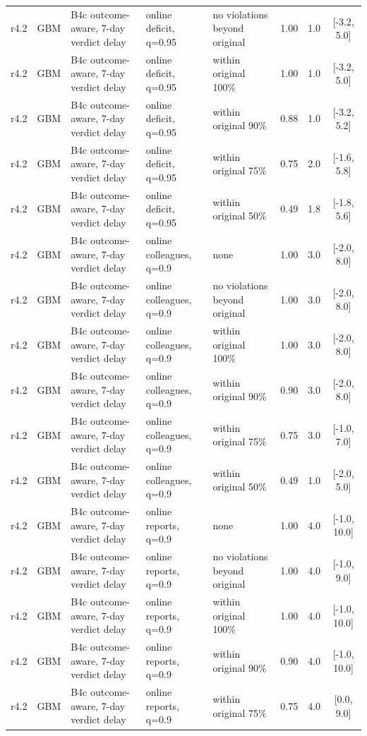 \documentclass[10pt,onecolumn,letterpaper]{article}
\begin{document}
\begin{longtable}{lllp{4.2cm}p{3.4cm}ccc}
r4.2 & GBM & B4c outcome-aware, 7-day verdict delay & online deficit, q=0.95 & no violations beyond original & 1.00 & 1.0 & [-3.2, 5.0] \\
r4.2 & GBM & B4c outcome-aware, 7-day verdict delay & online deficit, q=0.95 & within original 100\% & 1.00 & 1.0 & [-3.2, 5.0] \\
r4.2 & GBM & B4c outcome-aware, 7-day verdict delay & online deficit, q=0.95 & within original 90\% & 0.88 & 1.0 & [-3.2, 5.2] \\
r4.2 & GBM & B4c outcome-aware, 7-day verdict delay & online deficit, q=0.95 & within original 75\% & 0.75 & 2.0 & [-1.6, 5.8] \\
r4.2 & GBM & B4c outcome-aware, 7-day verdict delay & online deficit, q=0.95 & within original 50\% & 0.49 & 1.8 & [-1.8, 5.6] \\
r4.2 & GBM & B4c outcome-aware, 7-day verdict delay & online colleagues, q=0.9 & none & 1.00 & 3.0 & [-2.0, 8.0] \\
r4.2 & GBM & B4c outcome-aware, 7-day verdict delay & online colleagues, q=0.9 & no violations beyond original & 1.00 & 3.0 & [-2.0, 8.0] \\
r4.2 & GBM & B4c outcome-aware, 7-day verdict delay & online colleagues, q=0.9 & within original 100\% & 1.00 & 3.0 & [-2.0, 8.0] \\
r4.2 & GBM & B4c outcome-aware, 7-day verdict delay & online colleagues, q=0.9 & within original 90\% & 0.90 & 3.0 & [-2.0, 8.0] \\
r4.2 & GBM & B4c outcome-aware, 7-day verdict delay & online colleagues, q=0.9 & within original 75\% & 0.75 & 3.0 & [-1.0, 7.0] \\
r4.2 & GBM & B4c outcome-aware, 7-day verdict delay & online colleagues, q=0.9 & within original 50\% & 0.49 & 1.0 & [-2.0, 5.0] \\
r4.2 & GBM & B4c outcome-aware, 7-day verdict delay & online reports, q=0.9 & none & 1.00 & 4.0 & [-1.0, 10.0] \\
r4.2 & GBM & B4c outcome-aware, 7-day verdict delay & online reports, q=0.9 & no violations beyond original & 1.00 & 4.0 & [-1.0, 9.0] \\
r4.2 & GBM & B4c outcome-aware, 7-day verdict delay & online reports, q=0.9 & within original 100\% & 1.00 & 4.0 & [-1.0, 10.0] \\
r4.2 & GBM & B4c outcome-aware, 7-day verdict delay & online reports, q=0.9 & within original 90\% & 0.90 & 4.0 & [-1.0, 10.0] \\
r4.2 & GBM & B4c outcome-aware, 7-day verdict delay & online reports, q=0.9 & within original 75\% & 0.75 & 4.0 & [0.0, 9.0] \\

\end{longtable}
\end{document}
